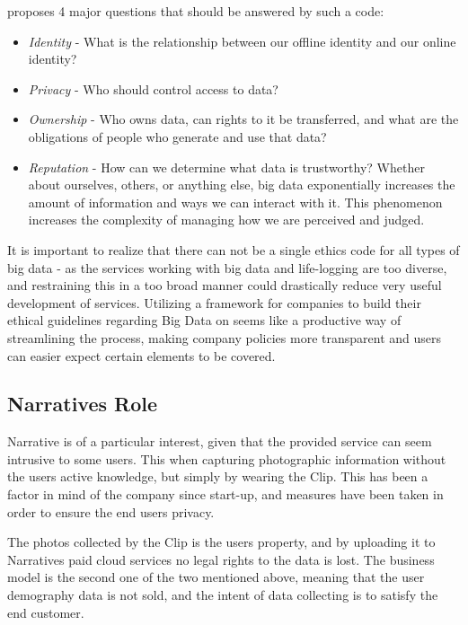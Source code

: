 \citeauthor{ethics-of-big-data} proposes 4 major questions that should 
be answered by such a code: \cite{ethics-of-big-data}
\begin{itemize}
    \item \textit{Identity} - What is the relationship between our 
        offline identity and our online identity?
    \item \textit{Privacy} - Who should control access to data?
    \item \textit{Ownership} - Who owns data, can rights to it be 
        transferred, and what are the obligations of people who 
        generate and use that data?
    \item \textit{Reputation} - How can we determine what data is 
        trustworthy? Whether about ourselves, others, or anything 
        else, big data exponentially increases the amount of 
        information and ways we can interact with it. This 
        phenomenon increases the complexity of managing how we are 
        perceived and judged.
\end{itemize}

It is important to realize that there can not be a single ethics 
code for all types of big data - as the services working with
big data and life-logging are too diverse, and restraining this 
in a too broad manner could drastically reduce very useful 
development of services. Utilizing a framework for companies to
build their ethical guidelines regarding Big Data on seems like
a productive way of streamlining the process, making company
policies more transparent and users can easier expect certain 
elements to be covered.

\subsection{Narratives Role}

Narrative is of a particular interest, given that the provided 
service can seem intrusive to some users.
This when capturing photographic information without the users active 
knowledge, but simply by wearing the Clip. This has been a factor in 
mind of the company since start-up, and measures have been taken in 
order to ensure the end users privacy.

The photos collected by the Clip is the users property, and by 
uploading it to Narratives paid cloud services no legal rights to 
the data is lost. The business model is the second one of the two 
mentioned above, meaning that the user demography data is not sold, 
and the intent of data collecting is to satisfy the end customer.

